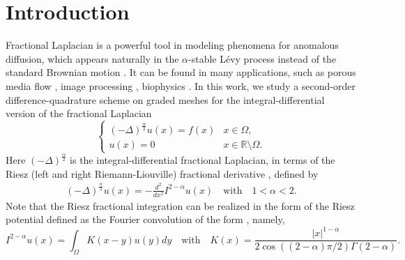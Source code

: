 \documentclass{amsart}
\theoremstyle{definition}
\theoremstyle{remark}
\numberwithin{equation}{section}
\begin{document}
\section{Introduction}
Fractional Laplacian is a powerful tool in modeling phenomena for anomalous diffusion, which appears naturally in the \(\alpha\)-stable L\'evy process instead of the standard Brownian motion %
\cite{ABBM2018,Bertoin:96,Getoor1961,MR2584076, MK:00}. It can be found in many applications, such as 
porous media flow \cite{MR2737788},
image processing \cite{MR3394445}, 
biophysics \cite{Andreu:10}.
In this work, we study a second-order difference-quadrature scheme on graded meshes for the integral-differential version of the   fractional Laplacian  
\begin{equation} \label{eq:equation}
  \begin{cases}
    (-\Delta)^{\frac{\alpha}{2}} u(x) = f(x) & x \in \Omega,                    \\
    u(x) = 0                                 & x \in \mathbb{R} \setminus \Omega.
  \end{cases}
\end{equation}
Here  $(-\Delta)^{\frac{\alpha}{2}}$ is the integral-differential   fractional Laplacian, in terms of the Riesz (left and right Riemann-Liouville) fractional derivative \cite{ABBM2018, HuangO:14, MR4043885,MR2796453}, defined by  
\begin{equation} \label{def:operator}
  \begin{split}  
      (-\Delta)^{\frac{\alpha}{2}} u(x) 
      = -\frac{d^2}{dx^2} I^{2-\alpha} u(x) 
      \quad  \text{with} \quad 1<\alpha<2.
  \end{split}
\end{equation}
Note that the Riesz fractional integration can be realized in the form of the Riesz potential
defined as the Fourier convolution of the form \cite[p.\,174]{FractionalDynamics}, namely,
\begin{equation} \label{def:I2-a}
  I^{2-\alpha} u(x) = \int_{\Omega} K(x-y) u(y) dy 
  \quad \text{with} \quad 
  K(x) = \frac{|x|^{1-\alpha}}{2\cos((2-\alpha)\pi/2)\Gamma(2-\alpha)}
  .
\end{equation}
\end{document}

